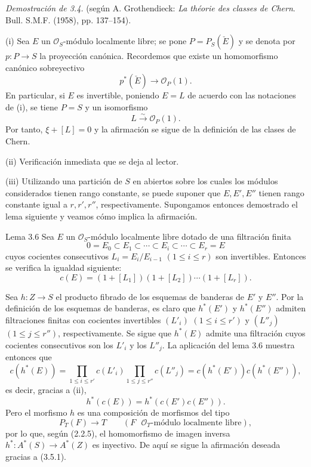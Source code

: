 \emph{Demostración de 3.4.} (según A. Grothendieck: \emph{La théorie des classes de Chern}. Bull. S.M.F. (1958), pp. 137--154).

(i) Sea $E$ un $\mathcal O_S$-módulo localmente libre; se pone $P=P_S(\check E)$ y se denota por $p:P\to S$ la proyección canónica. Recordemos que existe un homomorfismo canónico sobreyectivo
\[
p^*(\check E)\longrightarrow \mathcal O_P(1).
\]
En particular, si $E$ es invertible, poniendo $E=L$ de acuerdo con las notaciones de (i), se tiene $P=S$ y un isomorfismo
\[
L\xrightarrow{\sim}\mathcal O_P(1).
\]
Por tanto, $\xi+[L]=0$ y la afirmación se sigue de la definición de las clases de Chern.

(ii) Verificación inmediata que se deja al lector.

(iii) Utilizando una partición de $S$ en abiertos sobre los cuales los módulos considerados tienen rango constante, se puede suponer que $E,E',E''$ tienen rango constante igual a $r,r',r''$, respectivamente. Supongamos entonces demostrado el lema siguiente y veamos cómo implica la afirmación.

\begin{statement}{Lema 3.6}
Sea $E$ un $\mathcal O_S$-módulo localmente libre dotado de una filtración finita
\[
0=E_0\subset E_1\subset\cdots\subset E_i\subset\cdots\subset E_r=E
\]
cuyos cocientes consecutivos $L_i=E_i/E_{i-1}$ $(1\le i\le r)$ son invertibles. Entonces se verifica la igualdad siguiente:
\[
c(E)=(1+[L_1])(1+[L_2])\cdots(1+[L_r]).
\]
\end{statement}

Sea $h:Z\to S$ el producto fibrado de los esquemas de banderas de $E'$ y $E''$. Por la definición de los esquemas de banderas, es claro que $h^*(E')$ y $h^*(E'')$ admiten filtraciones finitas con cocientes invertibles $(L'_i)$ $(1\le i\le r')$ y $(L''_j)$ $(1\le j\le r'')$, respectivamente. Se sigue que $h^*(E)$ admite una filtración cuyos cocientes consecutivos son los $L'_i$ y los $L''_j$. La aplicación del lema 3.6 muestra entonces que
\[
c(h^*(E))=
\prod_{1\le i\le r'}c(L'_i)\prod_{1\le j\le r''}c(L''_j)
=c(h^*(E'))c(h^*(E'')),
\]
es decir, gracias a (ii),
\[
h^*(c(E))=h^*(c(E')c(E'')).
\tag{3.5.1}
\]
Pero el morfismo $h$ es una composición de morfismos del tipo
\[
P_T(F)\longrightarrow T
\qquad (F\text{ }\mathcal O_T\text{-módulo localmente libre}),
\]
por lo que, según (2.2.5), el homomorfismo de imagen inversa $h^*:A^*(S)\to A^*(Z)$ es inyectivo. De aquí se sigue la afirmación deseada gracias a (3.5.1).
